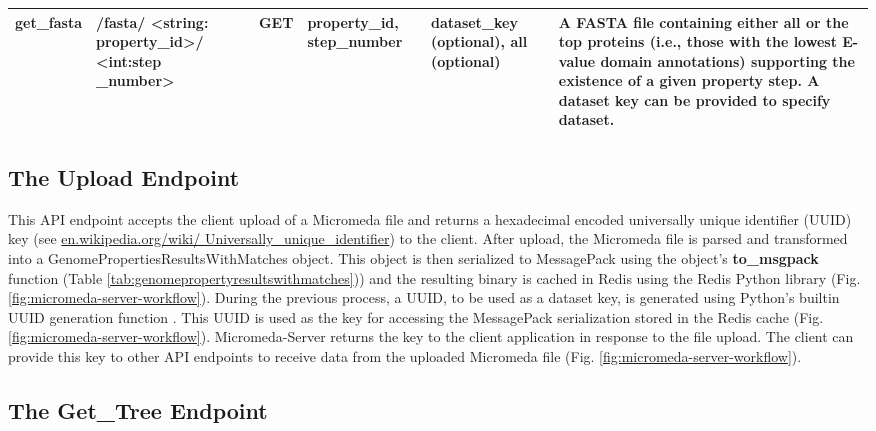\begin{longtable}{|p{1.6cm}|p{2.5cm}|p{1.4cm}|p{2.2cm}|p{2.2cm}|p{4cm}|}
get\_fasta & /fasta/ \textless{}string: property\_id\textgreater{}/ \textless{}int:step \_number\textgreater{} & GET & property\_id, step\_number & dataset\_key (optional), all (optional) & A FASTA file containing either all or the top proteins (i.e., those with the lowest E-value domain annotations) supporting the existence of a given property step. A dataset key can be provided to specify dataset. \\ \hline
\end{longtable}

\subsection{The Upload Endpoint} \label{endpoint-upload}

This API endpoint accepts the client upload of a Micromeda file and returns a hexadecimal encoded universally unique identifier (UUID) key \cite{leach2005universally} (see \href{en.wikipedia.org/wiki/Universally\_unique\_identifier}{en.wikipedia.org/wiki/ Universally\_unique\_identifier}) to the client. After upload, the Micromeda file is parsed and transformed into a GenomePropertiesResultsWithMatches object. This object is then serialized to MessagePack using the object's \textbf{to\_msgpack} function (Table \ref{tab:genomepropertyresultswithmatches})) and the resulting binary is cached in Redis using the Redis Python library \cite{mccurdy_2019} (Fig. \ref{fig:micromeda-server-workflow}). During the previous process, a UUID, to be used as a dataset key, is generated using Python's builtin UUID generation function \cite{PythonUUID}. This UUID is used as the key for accessing the MessagePack serialization stored in the Redis cache (Fig. \ref{fig:micromeda-server-workflow}). Micromeda-Server returns the key to the client application in response to the file upload. The client can provide this key to other API endpoints to receive data from the uploaded Micromeda file (Fig. \ref{fig:micromeda-server-workflow}). 

\subsection{The Get\_Tree Endpoint} \label{get-tree}

